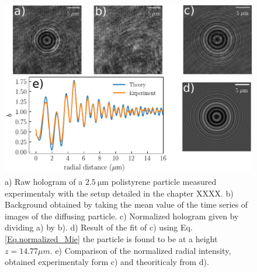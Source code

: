 \begin{figure}
	\centering
		\includegraphics[scale=0.8]{02_body/chapter2/images/lorenz_mie_fit_demo/plot_lorenz_mie.pdf}
		\caption{a) Raw hologram of a $2.5 ~ \mathrm{\mu m}$ polistyrene particle measured experimentaly with the setup detailed in the chapter XXXX. b) Background obtained by taking the mean value of the time series of images of the diffusing particle. c) Normalized hologram given by dividing a) by b). d) Result of the fit of c) using Eq.{\ref{Eq.normalized_Mie}} the particle is found to be at a height $z = 14.77 \mu m$. e) Comparison of the normalized radial intensity, obtained experimentaly form c) and theoriticaly from d).}
		\label{fig.Lorenz_mie_demo}
\end{figure}



